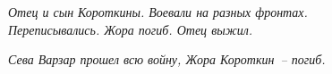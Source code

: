 \vfill

\begin{figure}[h!]
    \begin{minipage}{75mm}
        \begin{minipage}[h!]{34mm}
        \end{minipage}
        \hspace{3mm}
        \begin{minipage}[h!]{36mm}
        \end{minipage}
      
      
        \vspace{-10pt}
        \textit{\footnotesize{Отец и сын Короткины. Воевали на разных фронтах. Переписывались. Жора погиб. Отец выжил.}}  
      
    \end{minipage}
    \hspace{3mm}
    \begin{minipage}[h!]{37mm}
        
        \vspace{-10pt}
        \textit{\footnotesize{Сева Варзар прошел всю войну, Жора Короткин~-- погиб.}}
    \end{minipage}
      
      
\end{figure}

\newpage %


